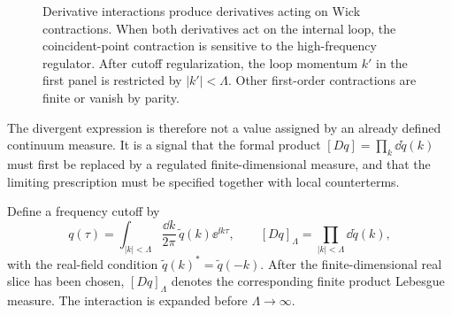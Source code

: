 \begin{figure}[H]
{
  }
  \caption{Derivative interactions produce derivatives acting on Wick
  contractions.  When both derivatives act on the internal loop, the
  coincident-point contraction is sensitive to the high-frequency regulator.
  After cutoff regularization, the loop momentum \(k'\) in the first panel is
  restricted by \(|k'|<\Lambda\).  Other first-order contractions are finite or
  vanish by parity.}
  \label{fig:volume-i-derivative-interaction-contractions}
\end{figure}

The divergent expression is therefore not a value assigned by an already
defined continuum measure.  It is a signal that the formal product
\([Dq]=\prod_k \dd\widetilde q(k)\) must first be replaced by a regulated
finite-dimensional measure, and that the limiting prescription must be
specified together with local counterterms.

\begin{definition}
\label{def:frequency-cutoff-derivative-oscillator}
Define a frequency cutoff by
\[
  q(\tau)
  =
  \int_{|k|<\Lambda}\frac{\dd k}{2\pi}\,
  \widetilde q(k)\ee^{\ii k\tau},
  \qquad
  [Dq]_\Lambda=\prod_{|k|<\Lambda}\dd \widetilde q(k),
\]
with the real-field condition \(\widetilde q(k)^*=\widetilde q(-k)\). After
the finite-dimensional real slice has been chosen, \([Dq]_\Lambda\) denotes
the corresponding finite product Lebesgue measure.  The interaction is
expanded before \(\Lambda\to\infty\).
\end{definition}


